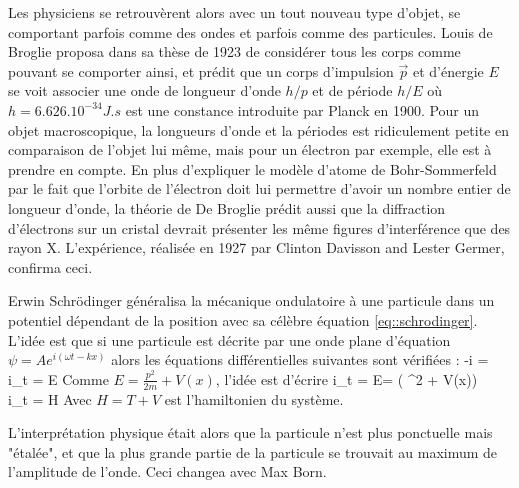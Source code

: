             Les physiciens se retrouvèrent alors avec un tout nouveau type d'objet, se comportant parfois comme des ondes et parfois comme des particules. Louis de Broglie proposa dans sa thèse de 1923\cite{debroglie} de considérer tous les corps comme pouvant se comporter ainsi, et prédit que un corps d'impulsion $\vec{p}$ et d'énergie $E$ se voit associer une onde de longueur d'onde $h/p$ et de période $h/E$ où $h=6.626.10^{-34}J.s$ est une constance introduite par Planck en 1900. Pour un objet macroscopique, la longueurs d'onde et la périodes est ridiculement petite en comparaison de l'objet lui même, mais pour un électron par exemple, elle est à prendre en compte. En plus d'expliquer le modèle d'atome de Bohr-Sommerfeld  par le fait que l'orbite de l'électron doit lui permettre d'avoir un nombre entier de longueur d'onde, la théorie de De Broglie prédit aussi que la diffraction d'électrons sur un cristal devrait présenter les même figures d'interférence que des rayon X. L'expérience, réalisée en 1927 par Clinton Davisson and Lester Germer, confirma ceci.
                
            Erwin Schrödinger généralisa la mécanique ondulatoire à une particule dans un potentiel dépendant de la position avec sa célèbre équation \eqref{eq::schrodinger}. L'idée est que si une particule est décrite par une onde plane d'équation $\psi=Ae^{i(\omega t-kx)}$ alors les équations différentielles suivantes sont vérifiées : 
            \beq 
                -i\hbar\Vec{\nabla} \psi = \psi \nonumber \\
                i\hbar\partial_t \psi = E\psi
            \eeq
            Comme $E=\frac{p^2}{2m}+V(x)$, l'idée est d'écrire 
            \beq\label{eq::schrodinger}
                i\hbar\partial_t \psi = E\psi = \left( \nabla^2 + V(x)\right)\psi \\ \nonumber 
                i\hbar\partial_t \psi = H\psi
            \eeq
            Avec $H=T+V$ est l'hamiltonien du système. 
                
            L'interprétation physique était alors que la particule n'est plus ponctuelle mais "étalée", et que la plus grande partie de la particule se trouvait au maximum de l'amplitude de l'onde. Ceci changea avec Max Born. 
                
